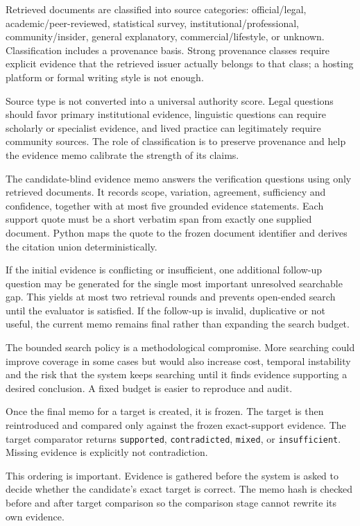 Retrieved documents are classified into source categories: official/legal, academic/peer-reviewed, statistical survey, institutional/professional, community/insider, general explanatory, commercial/lifestyle, or unknown. Classification includes a provenance basis. Strong provenance classes require explicit evidence that the retrieved issuer actually belongs to that class; a hosting platform or formal writing style is not enough.

Source type is not converted into a universal authority score. Legal questions should favor primary institutional evidence, linguistic questions can require scholarly or specialist evidence, and lived practice can legitimately require community sources. The role of classification is to preserve provenance and help the evidence memo calibrate the strength of its claims.

The candidate-blind evidence memo answers the verification questions using only retrieved documents. It records scope, variation, agreement, sufficiency and confidence, together with at most five grounded evidence statements. Each support quote must be a short verbatim span from exactly one supplied document. Python maps the quote to the frozen document identifier and derives the citation union deterministically.

If the initial evidence is conflicting or insufficient, one additional follow-up question may be generated for the single most important unresolved searchable gap. This yields at most two retrieval rounds and prevents open-ended search until the evaluator is satisfied. If the follow-up is invalid, duplicative or not useful, the current memo remains final rather than expanding the search budget.

The bounded search policy is a methodological compromise. More searching could improve coverage in some cases but would also increase cost, temporal instability and the risk that the system keeps searching until it finds evidence supporting a desired conclusion. A fixed budget is easier to reproduce and audit.

Once the final memo for a target is created, it is frozen. The target is then reintroduced and compared only against the frozen exact-support evidence. The target comparator returns \texttt{supported}, \texttt{contradicted}, \texttt{mixed}, or \texttt{insufficient}. Missing evidence is explicitly not contradiction.

This ordering is important. Evidence is gathered before the system is asked to decide whether the candidate's exact target is correct. The memo hash is checked before and after target comparison so the comparison stage cannot rewrite its own evidence.

